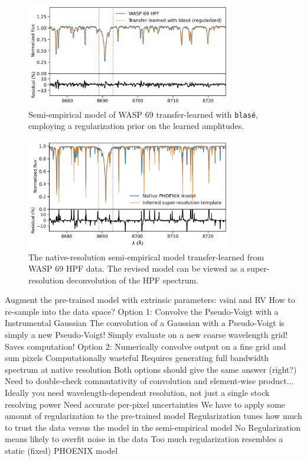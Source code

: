 \documentclass[modern]{aastex631}
\begin{document}
\begin{figure}[hbt!]
    \centering
    \includegraphics[width=0.8\textwidth]{figures/blase_WASP69_regularized.png}
    \caption{Semi-empirical model of WASP 69 transfer-learned with \texttt{blas\'e}, employing a regularization prior on the learned amplitudes.}
    \label{fig_WASP69_transferred}
\end{figure}

\begin{figure}[hbt!]
    \centering
    \includegraphics[width=0.8\textwidth]{figures/blase_super_resolution_template.png}
    \caption{The native-resolution semi-empirical model transfer-learned from WASP 69 HPF data. The revised model can be viewed as a super-resolution deconvolution of the HPF spectrum.}
    \label{fig_WASP69_regularized}
\end{figure}

\begin{outline}
    \1 Augment the pre-trained model with extrinsic parameters:
    \2 vsini and RV
    \1 How to re-sample into the data space?
    \1 Option 1: Convolve the Pseudo-Voigt with a Instrumental Gaussian
    \2 The convolution of a Gaussian with a Pseudo-Voigt is simply a new Pseudo-Voigt!
    \2 Simply evaluate on a new coarse wavelength grid! Saves computation!
    \1 Option 2: Numerically convolve output on a fine grid and sum pixels
    \2 Computationally wasteful
    \2 Requires generating full bandwidth spectrum at native resolution
    \1 Both options should give the same answer (right?)
    \2 Need to double-check commutativity of convolution and element-wise product...
    \1 Ideally you need wavelength-dependent resolution, not just a single stock resolving power
    \1 Need accurate per-pixel uncertainties
    \1 We have to apply some amount of regularization to the pre-trained model
    \2 Regularization tunes how much to trust the data versus the model in the semi-empirical model
    \2 No Regularization means likely to overfit noise in the data
    \2 Too much regularization resembles a static (fixed) PHOENIX model
\end{outline}
\end{document}
